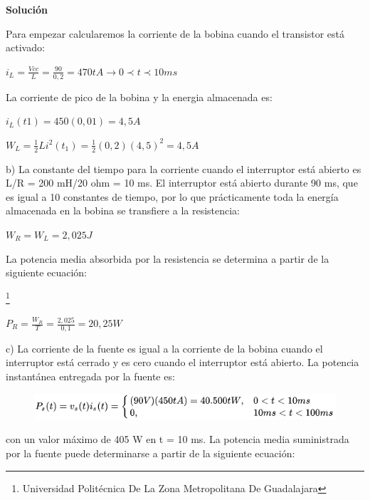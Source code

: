 \documentclass[11pt,a4paper]{article}
\begin{document}
\textbf{Solución}

 Para empezar calcularemos la corriente de la bobina cuando el transistor está activado:
 
\begin{Huge}
$ i_L = \frac{Vcc}{L} = \frac{90}{0,2} = 470tA \longrightarrow 0 \prec t \prec 10ms$
\end{Huge}

La corriente de pico de la bobina y la energia almacenada es: 

\begin{Huge}
$ i_L(t1) = 450(0,01) = 4,5A $

$ W_L = \frac{1}{2} Li^2 (t_1)= \frac{1}{2}(0,2)(4,5)^2 = 4,5A$
\end{Huge}

b) La constante del tiempo para la corriente cuando el interruptor está abierto es L/R = 200 mH/20 ohm = 10 ms. El interruptor está abierto durante 90 ms, que es igual a 10 constantes de tiempo, por lo que prácticamente toda la energía almacenada en la bobina se transfiere a la resistencia: 

\begin{huge}
$ W_R = W_L = 2,025J $

\end{huge} 

La potencia media absorbida por la resistencia se determina a partir de la siguiente ecuación: 

\footnote{Universidad Politécnica De La Zona Metropolitana De Guadalajara} 

\newpage

 \begin{Huge}
  $ P_R = \frac{W_R}{T} = \frac{2,025}{0,1} = 20,25W $
  \end{Huge} 

c) La corriente de la fuente es igual a la corriente de la bobina cuando el interruptor está cerrado y es cero cuando el interruptor está abierto. La potencia instantánea entregada por la fuente es: 

\begin{figure}[hbtp]
\centering
\includegraphics[scale=0.60]{7.png}
\end{figure}

con un valor máximo de 405 W en t = 10 ms. La potencia media suministrada por la fuente puede determinarse a partir de la siguiente ecuación: 
\end{document}

